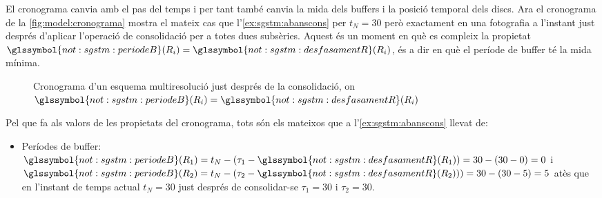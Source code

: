 \begin{example}
   \label{ex:sgstm:desprescons}


   El cronograma canvia amb el pas del temps i per tant també canvia
   la mida dels buffers i la posició temporal dels discs.  Ara el
   cronograma de la \autoref{fig:model:cronograma} mostra el mateix
   cas que l'\autoref{ex:sgstm:abanscons} per $t_N=30$ però exactament
   en una fotografia a l'instant just després d'aplicar l'operació de
   consolidació per a totes dues subsèries. Aquest és un moment en què
   es compleix la propietat $\glssymbol{not:sgstm:periodeB}(R_i)=
   \glssymbol{not:sgstm:desfasamentR}(R_i)$, és a dir en què el
   període de buffer té la mida mínima.

\begin{figure}[tp]
  \centering
  
  \caption{Cronograma d'un esquema multiresolució just després de la consolidació, on $\glssymbol{not:sgstm:periodeB}(R_i)=\glssymbol{not:sgstm:desfasamentR}(R_i)$}
  \label{fig:model:cronograma-consolidat}
\end{figure}



Pel que fa als valors de les propietats del cronograma, tots són els
mateixos que a l'\autoref{ex:sgstm:abanscons} llevat de:
 \begin{itemize}
  \item Períodes de buffer: $\glssymbol{not:sgstm:periodeB}(R_1)
    =t_N-(\tau_1-\glssymbol{not:sgstm:desfasamentR}(R_1))
    =30-(30-0)=0$ i $\glssymbol{not:sgstm:periodeB}(R_2)
    =t_N-(\tau_2-\glssymbol{not:sgstm:desfasamentR}(R_2)))
    =30-(30-5)=5$ atès que en l'instant de temps actual $t_N=30$ just
    després de consolidar-se $\tau_1=30$ i $\tau_2=30$.
  \end{itemize}
 

\end{example}





